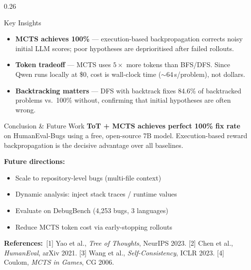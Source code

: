 \documentclass[final]{beamer}
\begin{document}
\begin{frame}[t]{}
\begin{columns}[t,totalwidth=\textwidth]
\begin{column}{0.26\textwidth}
\begin{block}{Key Insights}
\begin{itemize}
  \item \textbf{MCTS achieves 100\%} — execution-based backpropagation corrects noisy initial LLM scores; poor hypotheses are deprioritised after failed rollouts.

  \item \textbf{Token tradeoff} — MCTS uses $5\times$ more tokens than BFS/DFS. Since Qwen runs locally at \$0, cost is wall-clock time (${\sim}$64\,s/problem), not dollars.

  \item \textbf{Backtracking matters} — DFS with backtrack fixes 84.6\% of backtracked problems vs.\ 100\% without, confirming that initial hypotheses are often wrong.
\end{itemize}
\end{block}

\vspace{0.5cm}

\begin{block}{Conclusion \& Future Work}
\textbf{ToT + MCTS achieves perfect 100\% fix rate} on HumanEval-Bugs using a free, open-source 7B model. Execution-based reward backpropagation is the decisive advantage over all baselines.

\vspace{0.35cm}
\textbf{Future directions:}
\begin{itemize}
\setlength{\itemsep}{2pt}
  \item Scale to repository-level bugs (multi-file context)
  \item Dynamic analysis: inject stack traces / runtime values
  \item Evaluate on DebugBench (4,253 bugs, 3 languages)
  \item Reduce MCTS token cost via early-stopping rollouts
\end{itemize}

\vspace{0.35cm}
\textbf{References:}\,\small
[1] Yao et al., \textit{Tree of Thoughts}, NeurIPS 2023.
[2] Chen et al., \textit{HumanEval}, arXiv 2021.
[3] Wang et al., \textit{Self-Consistency}, ICLR 2023.
[4] Coulom, \textit{MCTS in Games}, CG 2006.
\end{block}

\end{column}
\end{columns}

\end{frame}
\end{document}
